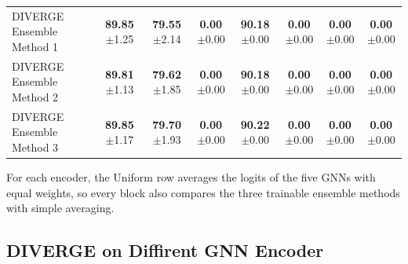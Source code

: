 \documentclass[a4paper,fleqn]{cas-sc}
\begin{document}
\begin{table}[htbp]
\begin{tabular*}{\textwidth}{@{\extracolsep{\fill}} lccccccc @{}}
DIVERGE Ensemble Method 1 & \textbf{89.85}{\scriptsize$\pm$1.25} & \textbf{79.55}{\scriptsize$\pm$2.14} & \textbf{0.00}{\scriptsize$\pm$0.00} & \textbf{90.18}{\scriptsize$\pm$0.00} & \textbf{0.00}{\scriptsize$\pm$0.00} & \textbf{0.00}{\scriptsize$\pm$0.00} & \textbf{0.00}{\scriptsize$\pm$0.00} \\
DIVERGE Ensemble Method 2 & \textbf{89.81}{\scriptsize$\pm$1.13} & \textbf{79.62}{\scriptsize$\pm$1.85} & \textbf{0.00}{\scriptsize$\pm$0.00} & \textbf{90.18}{\scriptsize$\pm$0.00} & \textbf{0.00}{\scriptsize$\pm$0.00} & \textbf{0.00}{\scriptsize$\pm$0.00} & \textbf{0.00}{\scriptsize$\pm$0.00} \\
DIVERGE Ensemble Method 3 & \textbf{89.85}{\scriptsize$\pm$1.17} & \textbf{79.70}{\scriptsize$\pm$1.93} & \textbf{0.00}{\scriptsize$\pm$0.00} & \textbf{90.22}{\scriptsize$\pm$0.00} & \textbf{0.00}{\scriptsize$\pm$0.00} & \textbf{0.00}{\scriptsize$\pm$0.00} & \textbf{0.00}{\scriptsize$\pm$0.00} \\
\bottomrule
\end{tabular*}
\end{table}

For each encoder, the Uniform row averages the logits of the five GNNs with equal weights, so every block also compares the three trainable ensemble methods with simple averaging.


\subsection{DIVERGE on Diffirent GNN Encoder}\label{sec:gnn_encoders}
\end{document}
